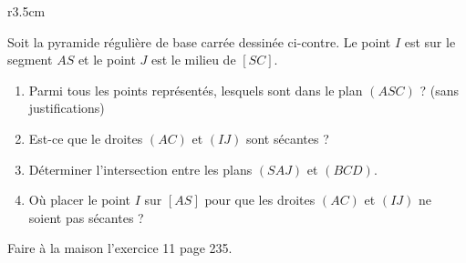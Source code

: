 
\begin{exercice}\label{exosmath-0081}

\begin{wrapfigure}{r}{3.5cm}
   \vspace{0cm}        %
   \centering
   
\end{wrapfigure}

        Soit la pyramide régulière de base carrée dessinée ci-contre. Le point \( I\) est sur le segment \( AS\) et le point \( J\) est le milieu de \( [SC]\).
        \begin{enumerate}
            \item
                Parmi tous les points représentés, lesquels sont dans le plan \( (ASC)\) ? (sans justifications)
            \item
                Est-ce que le droites \( (AC)\) et \( (IJ)\) sont sécantes ?
            \item
                Déterminer l'intersection entre les plans \( (SAJ)\) et \( (BCD)\).
            \item
                Où placer le point \( I\) sur \( [AS]\) pour que les droites \( (AC)\) et \( (IJ)\) ne soient pas sécantes ?
        \end{enumerate}

        Faire à la maison l'exercice 11 page 235.

\end{exercice}

